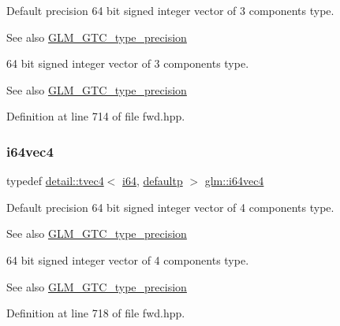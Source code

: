 Default precision 64 bit signed integer vector of 3 components type. \begin{DoxySeeAlso}{See also}
\hyperlink{group__gtc__type__precision}{G\+L\+M\+\_\+\+G\+T\+C\+\_\+type\+\_\+precision}
\end{DoxySeeAlso}
64 bit signed integer vector of 3 components type. \begin{DoxySeeAlso}{See also}
\hyperlink{group__gtc__type__precision}{G\+L\+M\+\_\+\+G\+T\+C\+\_\+type\+\_\+precision} 
\end{DoxySeeAlso}


Definition at line 714 of file fwd.\+hpp.

\mbox{\label{group__gtc__type__precision_ga19846034cab6ee6e031884ea30def7fc}} 
\subsubsection{\texorpdfstring{i64vec4}{i64vec4}}
{\footnotesize\ttfamily typedef \hyperlink{structglm_1_1detail_1_1tvec4}{detail\+::tvec4}$<$ \hyperlink{group__gtc__type__precision_gac7a7eaad46064fc952b06df33689da23}{i64}, \hyperlink{namespaceglm_a0f04f086094c747d227af4425893f545a9d21ccd8b5a009ec7eb7677befc3bf51}{defaultp} $>$ \hyperlink{group__gtc__type__precision_ga19846034cab6ee6e031884ea30def7fc}{glm\+::i64vec4}}

Default precision 64 bit signed integer vector of 4 components type. \begin{DoxySeeAlso}{See also}
\hyperlink{group__gtc__type__precision}{G\+L\+M\+\_\+\+G\+T\+C\+\_\+type\+\_\+precision}
\end{DoxySeeAlso}
64 bit signed integer vector of 4 components type. \begin{DoxySeeAlso}{See also}
\hyperlink{group__gtc__type__precision}{G\+L\+M\+\_\+\+G\+T\+C\+\_\+type\+\_\+precision} 
\end{DoxySeeAlso}


Definition at line 718 of file fwd.\+hpp.

\mbox{\label{group__gtc__type__precision_gaae064be68b7d36cd7910c16e8ad18bba}} 
